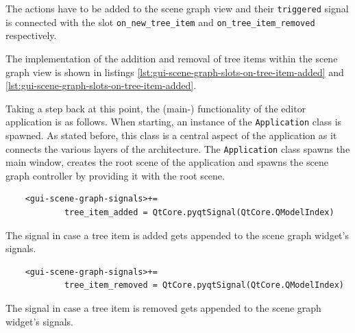 \documentclass[10pt, openright, notitlepage]{scrreprt}
\begin{document}
The actions have to be added to the scene graph view and their
\texttt{triggered} signal is connected with the slot \texttt{on\_new\_tree\_item}
and \texttt{on\_tree\_item\_removed} respectively.

The implementation of the addition and removal of tree items within the scene
graph view is shown in listings \ref{lst:gui-scene-graph-slots-on-tree-item-added} and
\ref{lst:gui-scene-graph-slots-on-tree-item-added}.

Taking a step back at this point, the (main-) functionality of the editor
application is as follows. When starting, an instance of the
\texttt{Application} class is spawned. As stated before, this class
is a central aspect of the application as it connects the various layers of the
architecture. The \texttt{Application} class spawns the main window, creates
the root scene of the application and spawns the scene graph controller by
providing it with the root scene.

\begin{listing}[H]
\begin{verbatim}
    <gui-scene-graph-signals>+=
            tree_item_added = QtCore.pyqtSignal(QtCore.QModelIndex)
\end{verbatim}
\caption{\label{lst:gui-scene-graph-signals-tree-item-removed}
The signal in case a tree item is added gets appended to the scene graph widget's signals.}
\end{listing}
\begin{listing}[H]
\begin{verbatim}
    <gui-scene-graph-signals>+=
            tree_item_removed = QtCore.pyqtSignal(QtCore.QModelIndex)
\end{verbatim}
\caption{\label{lst:gui-scene-graph-signals-tree-item-removed}
The signal in case a tree item is removed gets appended to the scene graph widget's signals.}
\end{listing}
\end{document}
